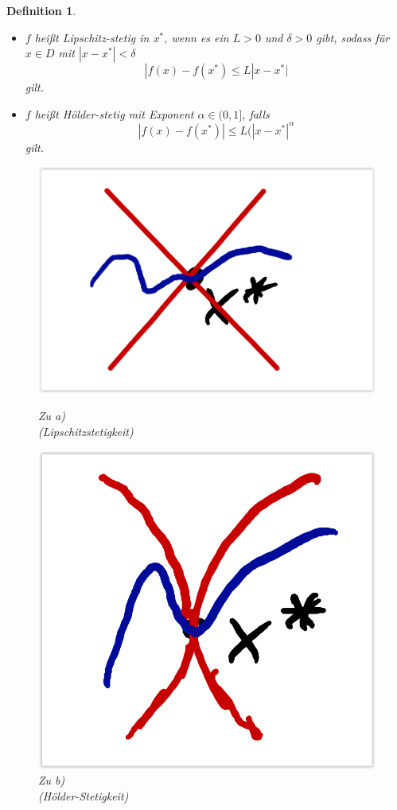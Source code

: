 \documentclass[12pt,a4paper]{report}%
\newtheorem{definition}[satz]{Definition}
\numberwithin{equation}{section}
\numberwithin{equation}{subsection}
\begin{document}
  \begin{definition}
    \begin{itemize}
      \item[a) ] $f$ heißt Lipschitz-stetig in $x^*$, wenn es ein $L > 0$ und $\delta > 0$ gibt, sodass für $x \in D$ mit $|x-x^*| < \delta$
	      \begin{equation}
	        |f(x) - f(x^*) \leq L|x-x^*|
	      \end{equation}
	      gilt.
      \item[b) ] $f$ heißt Hölder-stetig mit Exponent $\alpha \in (0,1]$, falls
	      \begin{equation}
	        |f(x) - f(x^*)| \leq L(|x-x^*|^\alpha
	      \end{equation}
	      gilt.
    \end{itemize}
    \begin{figure}[H] 
			\centering
			\begin{minipage}{.5\textwidth}
			  \centering
			  \captionsetup{justification=centering}
			  \includegraphics[width=0.9\linewidth]{stetigkeit_lipschitz.png}
			  \caption{Zu a) \\ (Lipschitzstetigkeit) \protect\cite{HM12}}
			  \label{fig:stetigkeit_lipschitz}
			\end{minipage}%
			\begin{minipage}{.5\textwidth}
			  \centering
			  \captionsetup{justification=centering}
			  \includegraphics[width=0.65\linewidth]{stetigkeit_hoelder.png}
			  \caption{Zu b) \\ (Hölder-Stetigkeit) \protect\cite{HM12}}
			  \label{fig:stetigkeit_hoelder}
			\end{minipage}
    \end{figure}
  \end{definition}
\end{document}
